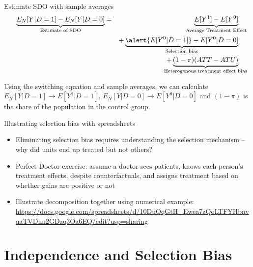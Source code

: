 \documentclass{beamer}
\begin{document}
\begin{frame}[plain]

  \begin{block}{Estimate SDO with sample averages}
    \begin{eqnarray*}
      \underbrace{E_N[Y | D=1] - E_N[Y | D=0]}_{ \mathclap{\text{Estimate of SDO}}}&=& \underbrace{E[Y^1] - E[Y^0]}_{ \mathclap{\text{Average Treatment Effect}}} \\
      &&+ \underbrace{\alert{E[Y^0|D=1]} - E[Y^0 | D=0]}_{ \mathclap{\text{Selection bias}}}  \\
      && + \underbrace{(1-\pi)(ATT - ATU)}_{ \mathclap{\text{Heterogenous treatment effect bias}}}
    \end{eqnarray*}
  \end{block}

\bigskip

Using the switching equation and sample averages, we can calculate $E_N[Y|D=1] \to E[Y^1 | D=1]$, $E_N[Y|D=0] \to E[Y^0|D=0]$ and $(1-\pi)$ is the share of the population in the control group.

\end{frame}

\begin{frame}{Illustrating selection bias with spreadsheets}
\begin{itemize}
\item Eliminating selection bias requires understanding the selection mechanism -- why did units end up treated but not others?
\item Perfect Doctor exercise: assume a doctor sees patients, knows each person's treatment effects, despite counterfactuals, and assigns treatment based on whether gains are positive or not
\item Illustrate decomposition together using numerical example: \url{https://docs.google.com/spreadsheets/d/10DuQqGtH_Ewea7zQoLTFYHbnvqaTVDhn2GDzq3Oa6EQ/edit?usp=sharing}
\end{itemize}
\end{frame}


\section{Independence and Selection Bias}
\end{document}

